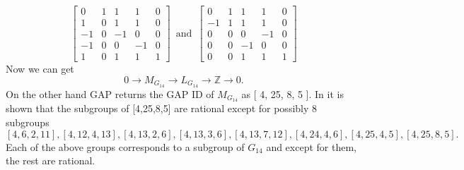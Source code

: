 \documentclass{article}
\theoremstyle{plain}
\theoremstyle{definition}
\newcommand{\Z}{\ensuremath{\mathbb{Z}}}
\newcommand{\tand}{\ensuremath{\,\,\, \text{and} \,\,\,}}
\newcommand{\exactseq}[1]{\ensuremath{0 \longrightarrow M_{#1} \longrightarrow L_{#1} \longrightarrow \Z \longrightarrow 0}}
\begin{document}
$$
\left[ \begin {array}{cccc|c} 0&1&1&1&0\\  1&0&1&1&0
\\  -1&0&-1&0&0\\  -1&0&0&-1&0
\\ \hline 1&0&1&1&1\end {array} \right] 
\tand
 \left[ \begin {array}{cccc|c} 0&1&1&1&0\\  -1&1&1&1&0
\\  0&0&0&-1&0\\  0&0&-1&0&0
\\  \hline 0&0&1&1&1\end {array} \right] 
$$
Now we can get 
$$\exactseq{G_{14}}.$$
On the other hand GAP returns the GAP ID of $M_{G_{14}}$  as [ 4, 25, 8, 5 ].
In \cite{Nicole1} it is shown that the subgroups of [4,25,8,5] are rational except for possibly 8 subgroups $$[4, 6, 2, 11], [4, 12, 4, 13], [4, 13, 2, 6], [4, 13, 3, 6], [4, 13, 7, 12], [4, 24, 4, 6], [4, 25, 4, 5], [4, 25, 8, 5].$$
Each of the above groups corresponds to a subgroup of $G_{14}$ and except for them, the rest are rational.
\\
\\
\end{document}
